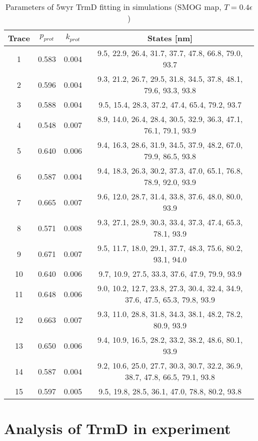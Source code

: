 \begin{table}
    \tiny
    \centering
    \caption{Parameters of 5wyr TrmD fitting in simulations (SMOG map, $T=0.4\epsilon$)}
    \label{tab:5wyr-sb-parameters}
    \begin{tabular}{c|c|c|c}
        \textbf{Trace} & \textbf{$p_{prot}$} & \textbf{$k_{prot}$} & \textbf{States [nm]}\\\hline
        1 & 0.583 & 0.004 & 9.5, 22.9, 26.4, 31.7, 37.7, 47.8, 66.8, 79.0, 93.7\\
        2 & 0.596 & 0.004 & 9.3, 21.2, 26.7, 29.5, 31.8, 34.5, 37.8, 48.1, 79.6, 93.3, 93.8\\
        3 & 0.588 & 0.004 & 9.5, 15.4, 28.3, 37.2, 47.4, 65.4, 79.2, 93.7\\
        4 & 0.548 & 0.007 & 8.9, 14.0, 26.4, 28.4, 30.5, 32.9, 36.3, 47.1, 76.1, 79.1, 93.9\\
        5 & 0.640 & 0.006 & 9.4, 16.3, 28.6, 31.9, 34.5, 37.9, 48.2, 67.0, 79.9, 86.5, 93.8\\
        6 & 0.587 & 0.004 & 9.4, 18.3, 26.3, 30.2, 37.3, 47.0, 65.1, 76.8, 78.9, 92.0, 93.9\\
        7 & 0.665 & 0.007 & 9.6, 12.0, 28.7, 31.4, 33.8, 37.6, 48.0, 80.0, 93.9\\
        8 & 0.571 & 0.008 & 9.3, 27.1, 28.9, 30.3, 33.4, 37.3, 47.4, 65.3, 78.1, 93.9\\
        9 & 0.671 & 0.007 & 9.5, 11.7, 18.0, 29.1, 37.7, 48.3, 75.6, 80.2, 93.1, 94.0\\
        10 & 0.640 & 0.006 & 9.7, 10.9, 27.5, 33.3, 37.6, 47.9, 79.9, 93.9\\
        11 & 0.648 & 0.006 & 9.0, 10.2, 12.7, 23.8, 27.3, 30.4, 32.4, 34.9, 37.6, 47.5, 65.3, 79.8, 93.9\\
        12 & 0.663 & 0.007 & 9.3, 11.0, 28.8, 31.8, 34.3, 38.1, 48.2, 78.2, 80.9, 93.9\\
        13 & 0.650 & 0.006 & 9.4, 10.9, 16.5, 28.2, 33.2, 38.2, 48.6, 80.1, 93.9\\
        14 & 0.587 & 0.004 & 9.2, 10.6, 25.0, 27.7, 30.3, 30.7, 32.2, 36.9, 38.7, 47.8, 66.5, 79.1, 93.8\\
        15 & 0.597 & 0.005 & 9.5, 19.8, 28.5, 36.1, 47.0, 78.8, 80.2, 93.8\\
    \end{tabular}
\end{table}

\section{Analysis of TrmD in experiment}
\label{sec:fit-details-trmd-experiment}
